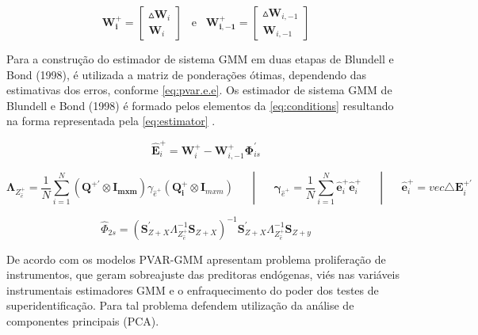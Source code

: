 \documentclass[
  12pt,
  12pt,
  openright,
  oneside,
  a4paper,
  chapter=TITLE,
  section=TITLE,
  subsection=TITLE,
  subsubsection=TITLE,
  english,
  portugues,
  sumario=tradicional]{abntex2}
\begin{document}
\begin{equation}\label{eq:pvar.gdata}
\mathbf{W^{+}_{i}} = \left[\begin{array}{c}
\vartriangle\mathbf{W}_{i}  \\
\mathbf{W}_{i} 
\end{array}\right]\hspace{10pt}\text{e}\hspace{10pt}\mathbf{W^{+}_{i, -1}} = \left[\begin{array}{c}
\vartriangle\mathbf{W}_{i,-1}  \\
\mathbf{W}_{i,-1} 
\end{array}\right]
\end{equation}

Para a construção do estimador de sistema GMM em duas etapas de Blundell e Bond (1998), é utilizada a matriz de ponderações ótimas, dependendo das estimativas dos erros, conforme \autoref{eq:pvar.e.e}. Os estimador de sistema GMM de Blundell e Bond (1998) é formado pelos elementos da \autoref{eq:conditions} resultando na forma representada pela \autoref{eq:estimator} \cite{sigmund:2008}.

\begin{equation}\label{eq:pvar.e.e}
\mathbf{\hat{E}}_{i}^{+} = \mathbf{W}_{i}^{+} - \mathbf{W}_{i,-1}^{+}\mathbf{\Phi}_{is}^{'} 
\end{equation}

\begin{equation}\label{eq:conditions}\mathbf{\Lambda}_{Z^{+}_{\hat{e}}} = \frac{1}{N}\sum_{i = 1}^{N}(\mathbf{Q^{+'}}\otimes\mathbf{I_{m x m}})\gamma_{\hat{e}^{+}}(\mathbf{Q_{i}^{+}}\otimes\mathbf{I}_{mxm})\hspace{20pt} |  \hspace{20pt}\mathbf{\gamma}_{\hat{e}^{+}} = \frac{1}{N}\sum_{i=1}^{N} \mathbf{\hat{e}}_{i}^{+} \mathbf{\hat{e}}_{i}^{+} \hspace{20pt} |  \hspace{20pt}\mathbf{\hat{e}}_{i}^{+} = vec{\triangle\mathbf{E}_{i}^{+'}} 
\end{equation}

\begin{equation}\label{eq:estimator}
\hat{\Phi}_{2s} =  (\mathbf{S}^{'}_{Z+X} \Lambda^{-1}_{Z^{+}_{\hat{e}}}\mathbf{S}_{Z+X})^{-1} \mathbf{S}^{'}_{Z+X} \Lambda^{-1}_{Z^{+}_{\hat{e}}}\mathbf{S}_{Z+y}
\end{equation}

De acordo com \textcite{bontempi:2015} os modelos PVAR-GMM apresentam problema proliferação de instrumentos, que geram sobreajuste das preditoras endógenas, viés nas variáveis instrumentais estimadores GMM e o enfraquecimento do poder dos testes de superidentificação. Para tal problema \textcite{bontempi:2015} defendem utilização da análise de componentes principais (PCA).
\end{document}
